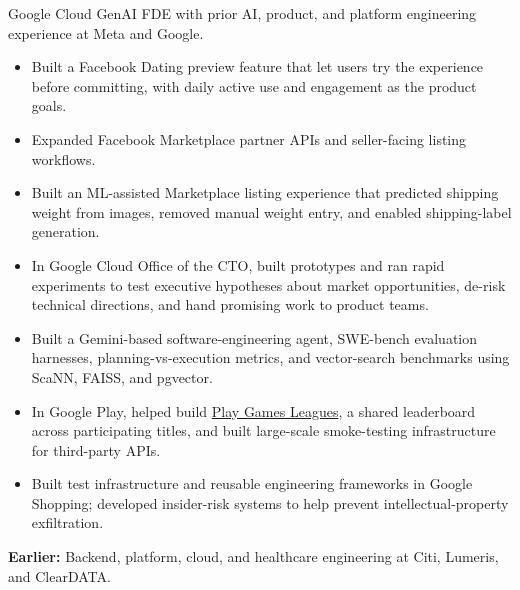 

\setlength{\parindent}{0pt}

\fontsize{10.5}{12.3}\selectfont
\raggedright

Google Cloud GenAI FDE with prior AI, product, and platform engineering experience at Meta and Google.



\begin{itemize}
  \item Built a Facebook Dating preview feature that let users try the experience before committing, with daily active use and engagement as the product goals.
  \item Expanded Facebook Marketplace partner APIs and seller-facing listing workflows.
  \item Built an ML-assisted Marketplace listing experience that predicted shipping weight from images, removed manual weight entry, and enabled shipping-label generation.
\end{itemize}

\begin{itemize}
  \item In Google Cloud Office of the CTO, built prototypes and ran rapid experiments to test executive hypotheses about market opportunities, de-risk technical directions, and hand promising work to product teams.
  \item Built a Gemini-based software-engineering agent, SWE-bench evaluation harnesses, planning-vs-execution metrics, and vector-search benchmarks using ScaNN, FAISS, and pgvector.
  \item In Google Play, helped build \href{https://blog.google/products-and-platforms/platforms/google-play/curation-update-september-2025/}{Play Games Leagues}, a shared leaderboard across participating titles, and built large-scale smoke-testing infrastructure for third-party APIs.
  \item Built test infrastructure and reusable engineering frameworks in Google Shopping; developed insider-risk systems to help prevent intellectual-property exfiltration.
\end{itemize}

\textbf{Earlier:} Backend, platform, cloud, and healthcare engineering at Citi, Lumeris, and ClearDATA.


